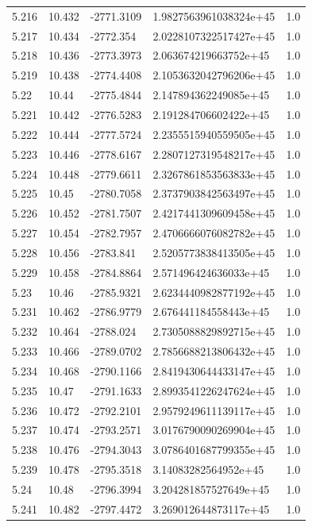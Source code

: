 \begin{tabular}{lllll}
5.216 & 10.432 & -2771.3109 & 1.9827563961038324e+45 & 1.0 \\
5.217 & 10.434 & -2772.354 & 2.0228107322517427e+45 & 1.0 \\
5.218 & 10.436 & -2773.3973 & 2.063674219663752e+45 & 1.0 \\
5.219 & 10.438 & -2774.4408 & 2.1053632042796206e+45 & 1.0 \\
5.22 & 10.44 & -2775.4844 & 2.147894362249085e+45 & 1.0 \\
5.221 & 10.442 & -2776.5283 & 2.191284706602422e+45 & 1.0 \\
5.222 & 10.444 & -2777.5724 & 2.2355515940559505e+45 & 1.0 \\
5.223 & 10.446 & -2778.6167 & 2.2807127319548217e+45 & 1.0 \\
5.224 & 10.448 & -2779.6611 & 2.3267861853563833e+45 & 1.0 \\
5.225 & 10.45 & -2780.7058 & 2.3737903842563497e+45 & 1.0 \\
5.226 & 10.452 & -2781.7507 & 2.4217441309609458e+45 & 1.0 \\
5.227 & 10.454 & -2782.7957 & 2.4706666076082782e+45 & 1.0 \\
5.228 & 10.456 & -2783.841 & 2.5205773838413505e+45 & 1.0 \\
5.229 & 10.458 & -2784.8864 & 2.571496424636033e+45 & 1.0 \\
5.23 & 10.46 & -2785.9321 & 2.6234440982877192e+45 & 1.0 \\
5.231 & 10.462 & -2786.9779 & 2.676441184558443e+45 & 1.0 \\
5.232 & 10.464 & -2788.024 & 2.7305088829892715e+45 & 1.0 \\
5.233 & 10.466 & -2789.0702 & 2.7856688213806432e+45 & 1.0 \\
5.234 & 10.468 & -2790.1166 & 2.8419430644433147e+45 & 1.0 \\
5.235 & 10.47 & -2791.1633 & 2.8993541226247624e+45 & 1.0 \\
5.236 & 10.472 & -2792.2101 & 2.9579249611139117e+45 & 1.0 \\
5.237 & 10.474 & -2793.2571 & 3.0176790090269904e+45 & 1.0 \\
5.238 & 10.476 & -2794.3043 & 3.0786401687799355e+45 & 1.0 \\
5.239 & 10.478 & -2795.3518 & 3.14083282564952e+45 & 1.0 \\
5.24 & 10.48 & -2796.3994 & 3.204281857527649e+45 & 1.0 \\
5.241 & 10.482 & -2797.4472 & 3.269012644873117e+45 & 1.0 \\

\end{tabular}
